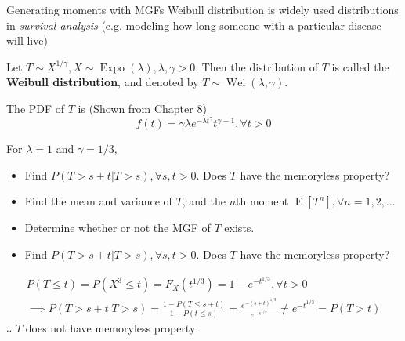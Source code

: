 \documentclass[8pt]{beamer}
\newcommand{\tb}[1]{\textbf{#1}}
\newcommand{\ti}[1]{\textit{#1}}
\newcommand{\myexpo}[1]{\operatorname{Expo}\!\left(#1\right)}
\newcommand{\expec}[1]{\operatorname{E}\left[ #1 \right]}
\newcommand{\mywei}[2]{\operatorname{Wei}\!\left(#1, #2\right)}
\begin{document}
\begin{frame}{Generating moments with MGFs}
    Weibull distribution is widely used distributions in \ti{survival analysis} (e.g. modeling how long someone with a particular disease will live)
    \begin{example}
        Let $T \sim X^{1/ \gamma}, X \sim \myexpo{\lambda}, \lambda,\gamma > 0$. Then the distribution of $T$ is called the \tb{Weibull distribution}, and denoted by $T \sim \mywei{\lambda}{\gamma}$.

        The PDF of $T$ is (Shown from Chapter 8)
        \[
        f(t) = \gamma \lambda e^{-\lambda t^{\gamma}}t^{\gamma -1}, \forall t > 0
        \] 

        For $\lambda = 1$ and $\gamma = 1/3$,
        \begin{itemize}
            \item Find $P(T > s+t | T> s), \forall s,t > 0$. Does $T$ have the memoryless property?
            \item Find the mean and variance of $T$, and the $n$th moment $\expec{T^n}, \forall n=1,2,\dots$
            \item Determine whether or not the MGF of $T$ exists.
        \end{itemize}
    \end{example}

    \begin{itemize}
        \item Find $P(T > s+t | T> s), \forall s,t > 0$. Does $T$ have the memoryless property?
    \end{itemize}
    \[
    \begin{gathered}
        P(T\leq t) = P(X^3 \leq t) = F_X(t^{1/3}) = 1 - e^{-t^{1/3}}, \forall t>0 \\
        \implies P(T> s+t | T>s) = \frac{1 - P(T \leq s+t)}{1 - P(t \leq s)} = \frac{e^{-(s+t)^{1/3}}}{e^{-s^{1/3}}} \neq e^{-t^{1/3}} = P(T > t)
    \end{gathered}
    \]
    $\therefore$ $T$ does not have memoryless property
\end{frame}
\end{document}
